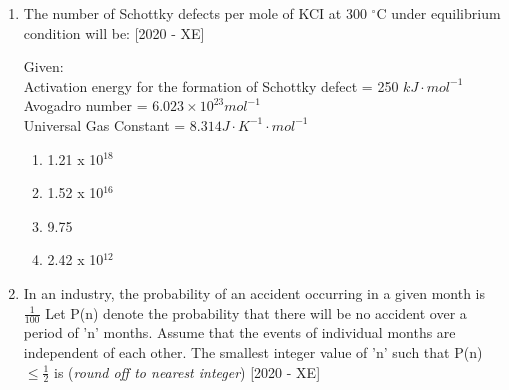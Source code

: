 \documentclass[journal]{IEEEtran}
\begin{document}
\begin{enumerate}
    \item The number of Schottky defects per mole of KCI at 300 $^\circ$C under equilibrium condition will be: \hfill{[2020 - XE]}
    
    Given:\\
    Activation energy for the formation of Schottky defect = 250 $kJ\cdot mol^{-1}$\\
    Avogadro number =  $6.023 \times 10^23 mol^{-1}$\\
    Universal Gas Constant = $8.314 J\cdot K^{-1}\cdot mol^{-1}$
    \begin{enumerate}
        \item 1.21 x 10$^{18}$
        \item 1.52 x 10$^{16}$
        \item 9.75
        \item 2.42 x 10$^{12}$
    \end{enumerate}
    
    \item In an industry, the probability of an accident occurring in a given month is $\frac{1}{100}$ Let P(n) denote the probability that there will be no accident over a period of 'n' months. Assume that the events of individual months are independent of each other. The smallest integer value of 'n' such that P(n)$\leq \frac{1}{2}$ is \underline{\hspace{3cm}} (\textit{round off to nearest integer}) \hfill{[2020 - XE]}
    

\end{enumerate}
\end{document}
